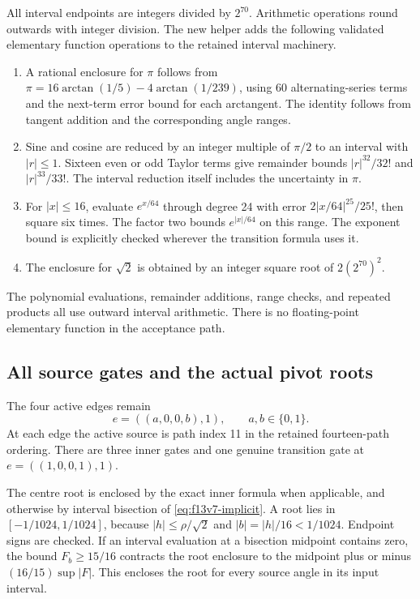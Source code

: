 \documentclass[11pt,oneside]{article}
\begin{document}
All interval endpoints are integers divided
by \(2^{70}\). Arithmetic operations round
outwards with integer division. The new helper
adds the following validated elementary
function operations to the retained interval
machinery.
\begin{enumerate}
\item A rational enclosure for \(\pi\) follows
from
\(\pi=16\arctan(1/5)-4\arctan(1/239)\),
using 60 alternating-series terms and the
next-term error bound for each arctangent.
The identity follows from tangent addition
and the corresponding angle ranges.
\item Sine and cosine are reduced by an
integer multiple of \(\pi/2\) to an interval
with \(|r|\le1\). Sixteen even or odd Taylor
terms give remainder bounds
\(|r|^{32}/32!\) and \(|r|^{33}/33!\).
The interval reduction itself includes the
uncertainty in \(\pi\).
\item For \(|x|\le16\), evaluate \(e^{x/64}\)
through degree 24 with error
\(2|x/64|^{25}/25!\), then square six times.
The factor two bounds \(e^{|x|/64}\) on this
range. The exponent bound is explicitly
checked wherever the transition formula
uses it.
\item The enclosure for \(\sqrt2\) is obtained
by an integer square root of \(2(2^{70})^2\).
\end{enumerate}
The polynomial evaluations, remainder additions,
range checks, and repeated products all use
outward interval arithmetic. There is no
floating-point elementary function in the
acceptance path.

\subsection{All source gates and the actual pivot roots}

The four active edges remain
\[
 e=((a,0,0,b),1),\qquad a,b\in\{0,1\}.
\]
At each edge the active source is path index
11 in the retained fourteen-path ordering.
There are three inner gates and one genuine
transition gate at \(e=((1,0,0,1),1)\).

The centre root is enclosed by the exact
inner formula when applicable, and otherwise
by interval bisection of
\eqref{eq:f13v7-implicit}. A root lies in
\([-1/1024,1/1024]\), because
\(|h|\le\rho/\sqrt2\) and
\(|b|=|h|/16<1/1024\). Endpoint signs are
checked. If an interval evaluation at a
bisection midpoint contains zero, the bound
\(F_b\ge15/16\) contracts the root enclosure
to the midpoint plus or minus
\((16/15)\sup|F|\). This encloses the root
for every source angle in its input interval.
\end{document}
